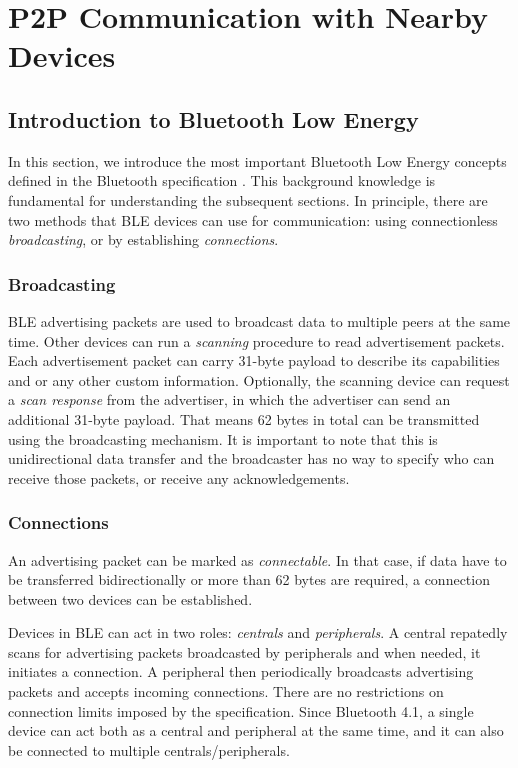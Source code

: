 \clearpage

\section{P2P Communication with Nearby Devices}

\subsection{Introduction to Bluetooth Low Energy}

In this section, we introduce the most important Bluetooth Low Energy concepts defined in the Bluetooth specification \cite{bluetooth51spec}. This background knowledge is fundamental for understanding the subsequent sections. In principle, there are two methods that BLE devices can use for communication: using connectionless \textit{broadcasting}, or by establishing \textit{connections}.

\subsubsection{Broadcasting}

BLE advertising packets are used to broadcast data to multiple peers at the same time. Other devices can run a \textit{scanning} procedure to read advertisement packets. Each advertisement packet can carry 31-byte payload to describe its capabilities and or any other custom information. Optionally, the scanning device can request a \textit{scan response} from the advertiser, in which the advertiser can send an additional 31-byte payload. That means 62 bytes in total can be transmitted using the broadcasting mechanism. It is important to note that this is unidirectional data transfer and the broadcaster has no way to specify who can receive those packets, or receive any acknowledgements.

\subsubsection{Connections}

An advertising packet can be marked as \textit{connectable}. In that case, if data have to be transferred bidirectionally or more than 62 bytes are required, a connection between two devices can be established.

Devices in BLE can act in two roles: \textit{centrals} and \textit{peripherals}. A central repatedly scans for advertising packets broadcasted by peripherals and when needed, it initiates a connection. A peripheral then periodically broadcasts advertising packets and accepts incoming connections. There are no restrictions on connection limits imposed by the specification. Since Bluetooth 4.1, a single device can act both as a central and peripheral at the same time, and it can also be connected to multiple centrals/peripherals.

